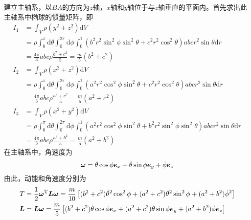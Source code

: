 \begin{solution}
建立主轴系，以$BA$的方向为$z$轴，$x$轴和$y$轴位于与$z$轴垂直的平面内。首先求出此主轴系中椭球的惯量矩阵，即
\begin{align*}
	I_1 & = \int_V \rho (y^2+z^2) \mathrm{d} V \\
	& = \rho \int_0^\pi \mathrm{d} \theta \int_0^{2\pi} \mathrm{d} \phi \int_0^1 (b^2r^2\sin^2 \phi \sin^2 \theta + c^2r^2 \cos^2 \theta) abc r^2 \sin \theta \mathrm{d} r \\
	& = \frac{4\pi}{3} abc \rho \frac{b^2+c^2}{5} = \frac{m}{5} (b^2+c^2) \\
	I_2 & = \int_V \rho (x^2+z^2) \mathrm{d} V \\
	& = \rho \int_0^\pi \mathrm{d} \theta \int_0^{2\pi} \mathrm{d} \phi \int_0^1 (a^2r^2\cos^2 \phi \sin^2 \theta + c^2r^2 \cos^2 \theta) abc r^2 \sin \theta \mathrm{d} r \\
	& = \frac{4\pi}{3} abc \rho \frac{a^2+c^2}{5} = \frac{m}{5} (a^2+c^2) \\
	I_3 & = \int_V \rho (x^2+y^2) \mathrm{d} V \\
	& = \rho \int_0^\pi \mathrm{d} \theta \int_0^{2\pi} \mathrm{d} \phi \int_0^1 (a^2r^2\cos^2 \phi \sin^2 \theta + b^2r^2 \sin^2 \phi \sin^2 \theta) abc r^2 \sin \theta \mathrm{d} r \\
	& = \frac{4\pi}{3} abc \rho \frac{a^2+b^2}{5} = \frac{m}{5} (a^2+b^2)
\end{align*}
在主轴系中，角速度为
\begin{equation*}
	\boldsymbol{\omega} = \dot{\theta} \cos \phi \boldsymbol{e}_x + \dot{\theta} \sin \phi \boldsymbol{e}_y + \dot{\phi} \boldsymbol{e}_z 
\end{equation*}
由此，动能和角速度分别为
\begin{align*}
	T & = \frac12 \boldsymbol{\omega}^{\mathrm{T}} \boldsymbol{L} \boldsymbol{\omega} = \frac{m}{10} \left[(b^2+c^2) \dot{\theta}^2 \cos^2 \phi + (a^2+c^2) \dot{\theta}^2 \sin^2 \phi + (a^2+b^2) \dot{\phi}^2\right] \\
	\boldsymbol{L} & = \boldsymbol{L} \boldsymbol{\omega} = \frac{m}{5} \left[(b^2+c^2) \dot{\theta} \cos \phi \boldsymbol{e}_x + (a^2+c^2) \dot{\theta} \sin \phi \boldsymbol{e}_y + (a^2+b^2) \dot{\phi} \boldsymbol{e}_z \right]
\end{align*}
\end{solution}

\iffalse
\begin{question}[金尚年《理论力学》148页4.29]
对称Lagrange陀螺的轴位于铅直位置，陀螺以很大的角速度$\omega$作稳定的自转。今突然在离定点$d$处作用一与陀螺的垂直轴垂直的冲量$p$。证明在陀螺此后的运动中，最大章动角近似为$2\arctan \dfrac{pd}{I_3 \omega}$。
\end{question}
\begin{solution}

\end{solution}

作业：p146-149，4.29（Lagrange陀螺），4.31

\subsection{非惯性系}\fi
